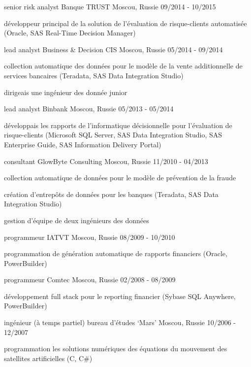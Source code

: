 \begin{cventries}
{    }
  \cventry
    {senior risk analyst}
    {Banque TRUST}
    {Moscou, Russie}
    {09/2014 - 10/2015}
    {
      \begin{cvitems}
        \item {développeur principal de la solution de l'évaluation de risque-clients automatisée (Oracle, SAS Real-Time Decision Manager)}
      \end{cvitems}
    }
  \cventry
    {lead analyst}
    {Business \& Decision CIS}
    {Moscou, Russie}
    {05/2014 - 09/2014}
    {
      \begin{cvitems}
        \item {collection automatique des données pour le modèle de la vente additionnelle de services bancaires (Teradata, SAS Data Integration Studio)}
        \item {dirigeais une ingénieur des donnée junior}
      \end{cvitems}
    }
  \cventry
    {lead analyst}
    {Binbank}
    {Moscou, Russie}
    {05/2013 - 05/2014}
    {
      \begin{cvitems}
        \item {développais les rapports de l'informatique décisionnelle pour l'évaluation de risque-clients (Microsoft SQL Server, SAS Data Integration Studio, SAS Enterprise Guide, SAS Information Delivery Portal)}
      \end{cvitems}
    }
  \cventry
    {consultant}
    {GlowByte Consulting}
    {Moscou, Russie}
    {11/2010 - 04/2013}
    {
      \begin{cvitems}
        \item {collection automatique de données pour le modèle de prévention de la fraude}
        \item {création d'entrepôts de données pour les banques (Teradata, SAS Data Integration Studio)}
        \item {gestion d'équipe de deux ingénieurs des données}
      \end{cvitems}
    }
  \cventry
    {programmeur}
    {IATVT}
    {Moscou, Russie}
    {08/2009 - 10/2010}
    {
      \begin{cvitems}
        \item {programmation de génération automatique de rapports financiers (Oracle, PowerBuilder)}
      \end{cvitems}
    }
  \cventry
    {programmeur}
    {Comtec}
    {Moscou, Russie}
    {02/2008 - 08/2009}
    {
      \begin{cvitems}
        \item {développement full stack pour le reporting financier (Sybase SQL Anywhere, PowerBuilder)}
      \end{cvitems}
    }
  \cventry
    {ingénieur (à temps partiel)}
    {bureau d'études `Mars'}
    {Moscou, Russie}
    {10/2006 - 12/2007}
    {
      \begin{cvitems}
        \item {programmation les solutions numériques des équations du mouvement des satellites artificielles (C, C\#)}
      \end{cvitems}
    }
\end{cventries}
